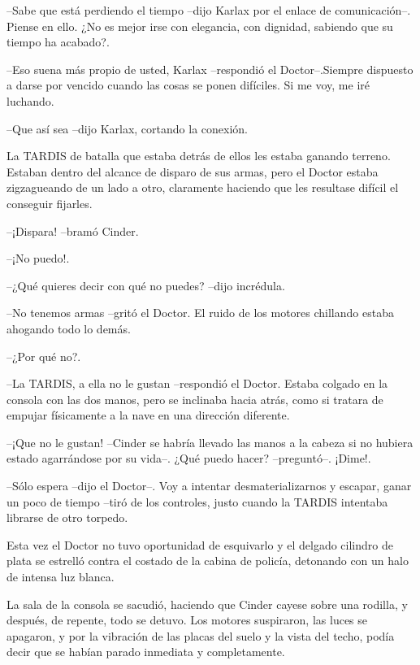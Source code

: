 --Sabe que está perdiendo el tiempo --dijo Karlax por el enlace de comunicación--. Piense en ello. ¿No es mejor irse con elegancia, con dignidad, sabiendo que su tiempo ha acabado?.

--Eso suena más propio de usted, Karlax --respondió el Doctor--.Siempre dispuesto a darse por vencido cuando las cosas se ponen difíciles. Si me voy, me iré luchando.

--Que así sea --dijo Karlax, cortando la conexión.



La TARDIS de batalla que estaba detrás de ellos les estaba ganando terreno. Estaban dentro del alcance de disparo de sus armas, pero el Doctor estaba zigzagueando de un lado a otro, claramente haciendo que les resultase difícil el conseguir fijarles.



--¡Dispara! --bramó Cinder.

--¡No puedo!.

--¿Qué quieres decir con qué no puedes? --dijo incrédula.

--No tenemos armas --gritó el Doctor. El ruido de los motores chillando estaba ahogando todo lo demás.

--¿Por qué no?.

--La TARDIS, a ella no le gustan --respondió el Doctor. Estaba colgado en la consola con las dos manos, pero se inclinaba hacia atrás, como si tratara de empujar físicamente a la nave en una dirección diferente.

--¡Que no le gustan! --Cinder se habría llevado las manos a la cabeza si no hubiera estado agarrándose por su vida--. ¿Qué puedo hacer? --preguntó--. ¡Dime!.

--Sólo espera --dijo el Doctor--. Voy a intentar desmaterializarnos y escapar, ganar un poco de tiempo --tiró de los controles, justo cuando la TARDIS intentaba librarse de otro torpedo.



Esta vez el Doctor no tuvo oportunidad de esquivarlo y el delgado cilindro de plata se estrelló contra el costado de la cabina de policía, detonando con un halo de intensa luz blanca.

La sala de la consola se sacudió, haciendo que Cinder cayese sobre una rodilla, y después, de repente, todo se detuvo. Los motores suspiraron, las luces se apagaron, y por la vibración de las placas del suelo y la vista del techo, podía decir que se habían parado inmediata y completamente.



